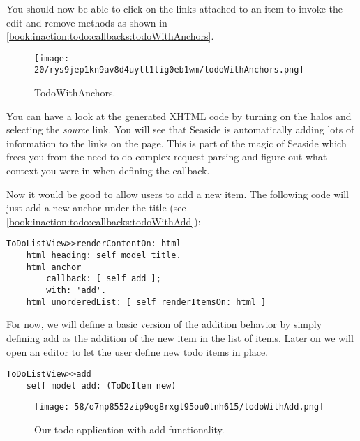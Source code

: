 \documentclass[a4paper,10pt,twoside]{book}
\newcommand{\ct}[1]{{\small\ttfamily\textup{#1}}}
\begin{document}
You should now be able to click on the links attached to an item to invoke the \ct{edit} and \ct{remove} methods as shown in  \autoref{book:inaction:todo:callbacks:todoWithAnchors}. 

\begin{figure}[h!tbp]
	\begin{center}
		\texttt{[image: 20/rys9jep1kn9av8d4uylt1lig0eb1wm/todoWithAnchors.png]}
		\caption{TodoWithAnchors.\label{book:inaction:todo:callbacks:todoWithAnchors}}
	\end{center}
\end{figure}


You can have a look at the generated XHTML code by turning on the halos and selecting the \textit{source} link. You will see that Seaside is automatically adding lots of information to the links on the page. This is part of the magic of Seaside which frees you from the need to do complex request parsing and figure out what context you were in when defining the callback.

Now it would be good to allow users to add a new item. The following code will just add a new anchor under the title (see \autoref{book:inaction:todo:callbacks:todoWithAdd}): 

\begin{lstlisting}
ToDoListView>>renderContentOn: html
    html heading: self model title.
    html anchor 
        callback: [ self add ];
        with: 'add'.
    html unorderedList: [ self renderItemsOn: html ]
\end{lstlisting}

For now, we will define a basic version of the addition behavior by simply defining \ct{add} as the addition of the new item in the list of items. Later on we will open an editor to let the user define new todo items in place. 

\begin{lstlisting}
ToDoListView>>add
    self model add: (ToDoItem new)
\end{lstlisting}

\begin{figure}[h!tbp]
	\begin{center}
		\texttt{[image: 58/o7np8552zip9og8rxgl95ou0tnh615/todoWithAdd.png]}
		\caption{Our todo application with add functionality.\label{book:inaction:todo:callbacks:todoWithAdd}}
	\end{center}
\end{figure}
\end{document}
